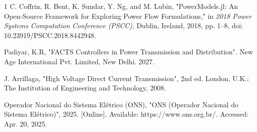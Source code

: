 \documentclass[letterpaper,journal]{IEEEtran}
\begin{document}
\begin{thebibliography}{1}
	C. Coffrin, R. Bent, K. Sundar, Y. Ng, and M. Lubin, "PowerModels.jl: An Open-Source Framework for Exploring Power Flow Formulations," in \textit{2018 Power Systems Computation Conference (PSCC)}, Dublin, Ireland, 2018, pp. 1--8, doi: 10.23919/PSCC.2018.8442948.

	Padiyar, K.R, "FACTS Controllers in Power Transmission and Distribution". New Age International Pvt. Limited, New Delhi. 2027.

	J. Arrillaga, "High Voltage Direct Current Transmission", 2nd ed. London, U.K.: The Institution of Engineering and Technology, 2008.

	Operador Nacional do Sistema Elétrico (ONS), "ONS (Operador Nacional do Sistema Elétrico)", 2025. [Online]. Available: https://www.ons.org.br/. Accessed: Apr. 20, 2025.

\end{thebibliography}
\endgroup
\end{document}
